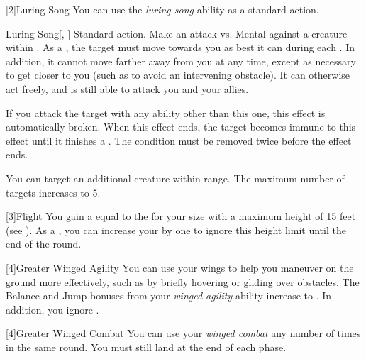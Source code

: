         [2]{Luring Song} You can use the \textit{luring song} ability as a standard action.
        \begin{magicalactiveability}{Luring Song}[, ]
            \abilityusagetime Standard action.
                \rankline
                Make an attack vs. Mental against a creature within \longrange.
                \hit As a , the target must move towards you as best it can during each .
                In addition, it cannot move farther away from you at any time, except as necessary to get closer to you (such as to avoid an intervening obstacle).
                It can otherwise act freely, and is still able to attack you and your allies.

                If you attack the target with any ability other than this one, this effect is automatically broken.
                When this effect ends, the target becomes immune to this effect until it finishes a .
                \crit The condition must be removed twice before the effect ends.

                \rankline
                 You can target an additional creature within range.
                 The maximum number of targets increases to 5.
            \end{magicalactiveability}

        [3]{Flight} You gain a  equal to the  for your size with a maximum height of 15 feet (see ).
        As a , you can increase your  by one to ignore this height limit until the end of the round.

        [4]{Greater Winged Agility} You can use your wings to help you maneuver on the ground more effectively, such as by briefly hovering or gliding over obstacles.
        The Balance and Jump bonuses from your \textit{winged agility} ability increase to .
        In addition, you ignore .

        [4]{Greater Winged Combat} You can use your \textit{winged combat} any number of times in the same round.
        You must still land at the end of each phase.

